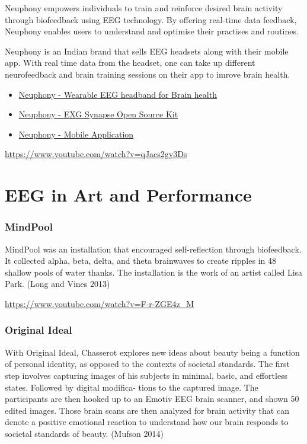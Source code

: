 \documentclass[
  letterpaper,
  DIV=11,
  numbers=noendperiod]{scrreprt}
\begin{document}
Neuphony empowers individuals to train and reinforce desired brain
activity through biofeedback using EEG technology. By offering real-time
data feedback, Neuphony enables users to understand and optimise their
practises and routines.

Neuphony is an Indian brand that sells EEG headsets along with their
mobile app. With real time data from the headset, one can take up
different neurofeedback and brain training sessions on their app to
imrove brain health.

\begin{itemize}
\item
  \href{https://neuphony.com/brain-wearables/eeg-headband/}{Neuphony -
  Wearable EEG headband for Brain health}
\item
  \href{https://neuphony.com/diy-neuroscience-kits/exg-synapse/}{Neuphony
  - EXG Synapse Open Source Kit}
\item
  \href{https://neuphony.com/softwares/mobile-application/}{Neuphony -
  Mobile Application}
\end{itemize}

\url{https://www.youtube.com/watch?v=qJacs2gy3Ds}

\chapter{EEG in Art and Performance}\label{eeg-in-art-and-performance}

\subsection{MindPool}\label{mindpool}

MindPool was an installation that encouraged self-reflection through
biofeedback. It collected alpha, beta, delta, and theta brainwaves to
create ripples in 48 shallow pools of water thanks. The installation is
the work of an artist called Lisa Park. (Long and Vines 2013)

\url{https://www.youtube.com/watch?v=F-r-ZGE4z_M}

\subsection{Original Ideal}\label{original-ideal}

With Original Ideal, Chasserot explores new ideas about beauty being a
function of personal identity, as opposed to the contexts of societal
standards. The first step involves capturing images of his subjects in
minimal, basic, and effortless states. Followed by digital modifica-
tions to the captured image. The participants are then hooked up to an
Emotiv EEG brain scanner, and shown 50 edited images. Those brain scans
are then analyzed for brain activity that can denote a positive
emotional reaction to understand how our brain responds to societal
standards of beauty. (Mufson 2014)
\end{document}
